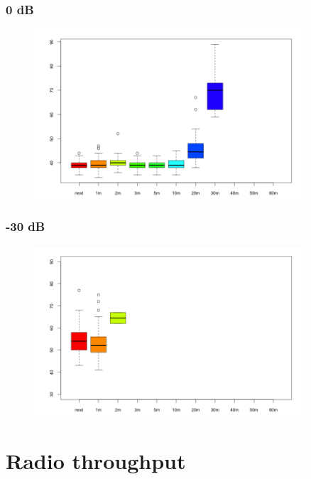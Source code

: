 \subsubsection{0 dB}

\begin{figure}[H]
  \centering
  \includegraphics[width=0.9\textwidth]{img/tests/lqi/db_00.png}
\end{figure}

\subsubsection{-30 dB}

\begin{figure}[H]
  \centering
  \includegraphics[width=0.9\textwidth]{img/tests/lqi/db_m30.png}
\end{figure}


\section{Radio throughput}

